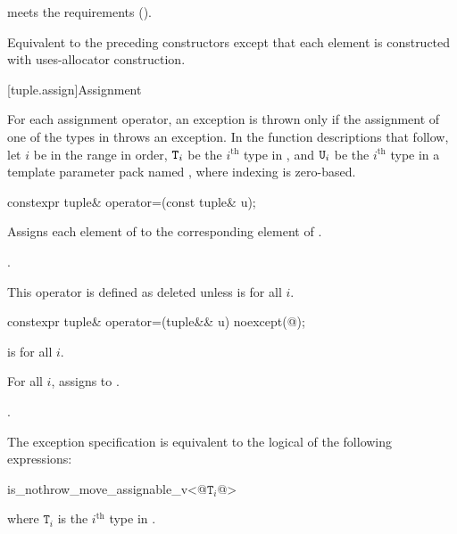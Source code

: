 \begin{itemdescr}
\pnum
\expects
{} meets the
 requirements ().

\pnum
\effects
Equivalent to the preceding constructors except that each element is constructed with
uses-allocator construction.
\end{itemdescr}

[tuple.assign]{Assignment}

\pnum
For each  assignment operator, an exception is thrown only if the
assignment of one of the types in  throws an exception.
In the function descriptions that follow, let $i$ be in the range 
in order, $\texttt{T}_i$ be the $i^\text{th}$ type in ,
and $\texttt{U}_i$ be the $i^\text{th}$ type in a
template parameter pack named , where indexing is zero-based.

%
\begin{itemdecl}
constexpr tuple& operator=(const tuple& u);
\end{itemdecl}

\begin{itemdescr}
\pnum
\effects
Assigns each element of  to the corresponding
element of .

\pnum
\returns
{}.

\pnum
\remarks
This operator is defined as deleted unless
 is  for all $i$.
\end{itemdescr}

%
\begin{itemdecl}
constexpr tuple& operator=(tuple&& u) noexcept(@\seebelow@);
\end{itemdecl}

\begin{itemdescr}
\pnum
\constraints
{} is  for all $i$.

\pnum
\effects
For all $i$, assigns  to
.

\pnum
\returns
{}.

\pnum
\remarks
The exception specification is equivalent to the logical  of the
following expressions:

\begin{codeblock}
is_nothrow_move_assignable_v<@$\mathtt{T}_i$@>
\end{codeblock}
where $\mathtt{T}_i$ is the $i^\text{th}$ type in .
\end{itemdescr}

